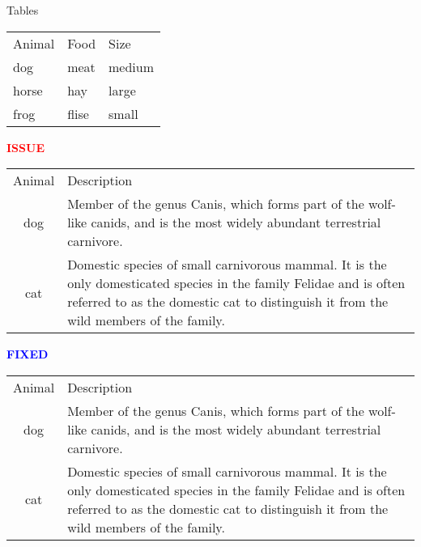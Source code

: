 \documentclass{article}
\begin{document}
Tables

\begin{tabular}{lll} %
    Animal  & Food  & Size      \\
    dog     & meat  & medium    \\
    horse   & hay   & large     \\
    frog    & flise & small     \\
\end{tabular}

\newpage

\textbf{\textcolor{red}{ISSUE}}

\begin{tabular}{cl}
    Animal  & Description   \\
    dog     & Member of the genus Canis, which forms part of the wolf-like 
              canids, and is the most widely abundant terrestrial carnivore. \\
    cat     & Domestic species of small carnivorous mammal. It is the only
              domesticated species in the family Felidae and is often referred
              to as the domestic cat to distinguish it from the wild members of
              the family. \\
\end{tabular}

\textbf{\textcolor{blue}{FIXED}}

\begin{tabular}{cp{9cm}}
    Animal  & Description   \\
    dog     & Member of the genus Canis, which forms part of the wolf-like 
              canids, and is the most widely abundant terrestrial carnivore. \\
    cat     & Domestic species of small carnivorous mammal. It is the only
              domesticated species in the family Felidae and is often referred
              to as the domestic cat to distinguish it from the wild members of
              the family. \\
\end{tabular}
\end{document}

